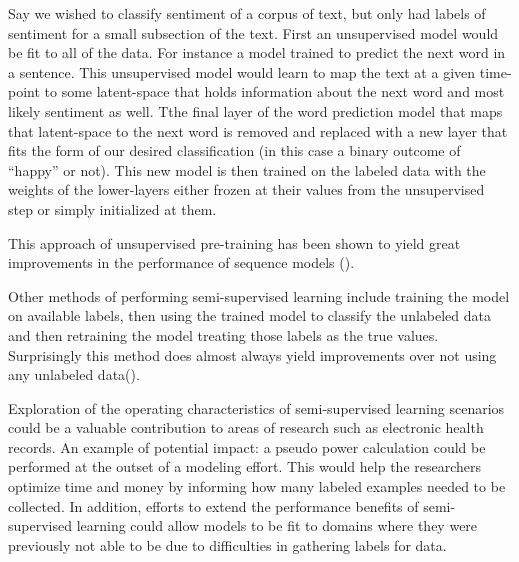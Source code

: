 \documentclass[]{book}
\theoremstyle{definition}
\theoremstyle{definition}
\theoremstyle{definition}
\theoremstyle{remark}
\begin{document}
Say we wished to classify sentiment of a corpus of text, but only had
labels of sentiment for a small subsection of the text. First an
unsupervised model would be fit to all of the data. For instance a model
trained to predict the next word in a sentence. This unsupervised model
would learn to map the text at a given time-point to some latent-space
that holds information about the next word and most likely sentiment as
well. Tthe final layer of the word prediction model that maps that
latent-space to the next word is removed and replaced with a new layer
that fits the form of our desired classification (in this case a binary
outcome of ``happy'' or not). This new model is then trained on the
labeled data with the weights of the lower-layers either frozen at their
values from the unsupervised step or simply initialized at them.

This approach of unsupervised pre-training has been shown to yield great
improvements in the performance of sequence models
(\citet{semi_supervised}).

Other methods of performing semi-supervised learning include training
the model on available labels, then using the trained model to classify
the unlabeled data and then retraining the model treating those labels
as the true values. Surprisingly this method does almost always yield
improvements over not using any unlabeled data(\citet{semi_supervised}).

Exploration of the operating characteristics of semi-supervised learning
scenarios could be a valuable contribution to areas of research such as
electronic health records. An example of potential impact: a pseudo
power calculation could be performed at the outset of a modeling effort.
This would help the researchers optimize time and money by informing how
many labeled examples needed to be collected. In addition, efforts to
extend the performance benefits of semi-supervised learning could allow
models to be fit to domains where they were previously not able to be
due to difficulties in gathering labels for data.


\end{document}
